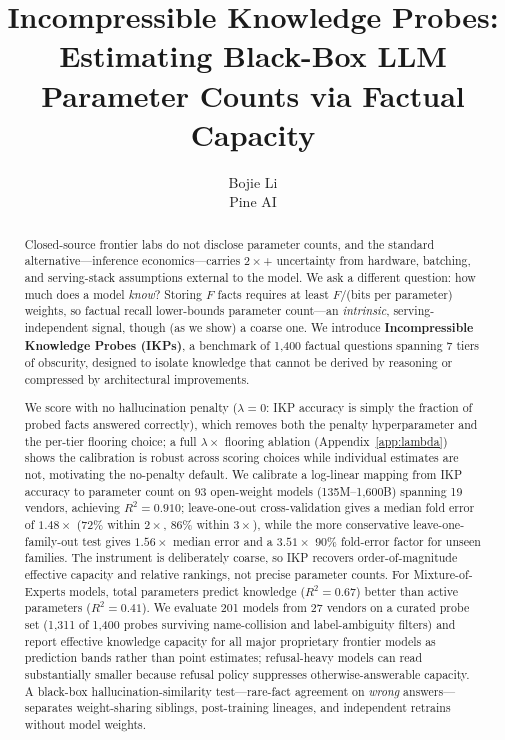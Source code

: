 \documentclass[11pt]{article}
\title{\textbf{Incompressible Knowledge Probes: Estimating Black-Box LLM Parameter Counts via Factual Capacity}}
\author{
  Bojie Li \\[6pt]
  Pine AI
}
\date{}
\begin{document}
\maketitle

\begin{abstract}
Closed-source frontier labs do not disclose parameter counts, and the standard alternative---inference economics---carries $2\times$+ uncertainty from hardware, batching, and serving-stack assumptions external to the model. We ask a different question: how much does a model \emph{know}? Storing $F$ facts requires at least $F/$(bits per parameter) weights, so factual recall lower-bounds parameter count---an \emph{intrinsic}, serving-independent signal, though (as we show) a coarse one. We introduce \textbf{Incompressible Knowledge Probes (IKPs)}, a benchmark of 1{,}400 factual questions spanning 7 tiers of obscurity, designed to isolate knowledge that cannot be derived by reasoning or compressed by architectural improvements.

We score with no hallucination penalty ($\lambda = 0$: IKP accuracy is simply the fraction of probed facts answered correctly), which removes both the penalty hyperparameter and the per-tier flooring choice; a full $\lambda \times$ flooring ablation (Appendix~\ref{app:lambda}) shows the calibration is robust across scoring choices while individual estimates are not, motivating the no-penalty default. We calibrate a log-linear mapping from IKP accuracy to parameter count on 93 open-weight models (135M--1{,}600B) spanning 19 vendors, achieving $R^2 = 0.910$; leave-one-out cross-validation gives a median fold error of $1.48\times$ ($72\%$ within $2\times$, $86\%$ within $3\times$), while the more conservative leave-one-family-out test gives $1.56\times$ median error and a $3.51\times$ 90\% fold-error factor for unseen families. The instrument is deliberately coarse, so IKP recovers order-of-magnitude effective capacity and relative rankings, not precise parameter counts. For Mixture-of-Experts models, total parameters predict knowledge ($R^2 = 0.67$) better than active parameters ($R^2 = 0.41$). We evaluate 201 models from 27 vendors on a curated probe set (1{,}311 of 1{,}400 probes surviving name-collision and label-ambiguity filters) and report effective knowledge capacity for all major proprietary frontier models as prediction bands rather than point estimates; refusal-heavy models can read substantially smaller because refusal policy suppresses otherwise-answerable capacity. A black-box hallucination-similarity test---rare-fact agreement on \emph{wrong} answers---separates weight-sharing siblings, post-training lineages, and independent retrains without model weights.


\end{abstract}
\end{document}
